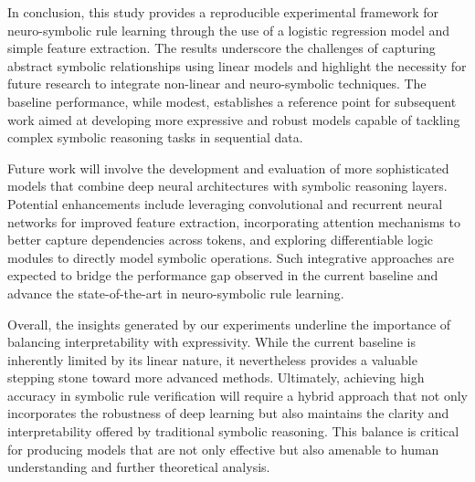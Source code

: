 \documentclass{article}
\begin{document}
In conclusion, this study provides a reproducible experimental framework for neuro-symbolic rule learning through the use of a logistic regression model and simple feature extraction. The results underscore the challenges of capturing abstract symbolic relationships using linear models and highlight the necessity for future research to integrate non-linear and neuro-symbolic techniques. The baseline performance, while modest, establishes a reference point for subsequent work aimed at developing more expressive and robust models capable of tackling complex symbolic reasoning tasks in sequential data.

Future work will involve the development and evaluation of more sophisticated models that combine deep neural architectures with symbolic reasoning layers. Potential enhancements include leveraging convolutional and recurrent neural networks for improved feature extraction, incorporating attention mechanisms to better capture dependencies across tokens, and exploring differentiable logic modules to directly model symbolic operations. Such integrative approaches are expected to bridge the performance gap observed in the current baseline and advance the state-of-the-art in neuro-symbolic rule learning.

Overall, the insights generated by our experiments underline the importance of balancing interpretability with expressivity. While the current baseline is inherently limited by its linear nature, it nevertheless provides a valuable stepping stone toward more advanced methods. Ultimately, achieving high accuracy in symbolic rule verification will require a hybrid approach that not only incorporates the robustness of deep learning but also maintains the clarity and interpretability offered by traditional symbolic reasoning. This balance is critical for producing models that are not only effective but also amenable to human understanding and further theoretical analysis.
\end{document}
